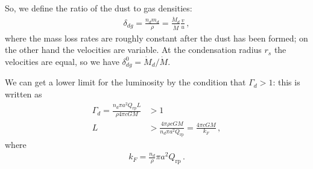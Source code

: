 \documentclass[main.tex]{subfiles}
\begin{document}
So, we define the ratio of the dust to gas densities: 
%
\begin{align}
\delta_{dg} = \frac{n_d m_d}{\rho } = \frac{\dot{M}_{d}}{\dot{M}} \frac{v}{u}
\,,
\end{align}
%
where the mass loss rates are roughly constant after the dust has been formed; on the other hand the velocities are variable. At the condensation radius \(r_s\) the velocities are equal, so we have \(\delta^{0}_{dg} = \dot{M}_{d} / \dot{M}\).

We can get a lower limit for the luminosity by the condition that \(\Gamma_{d}>1\): this is written as 
%
\begin{subequations}
\begin{align}
\Gamma_{d} = \frac{n_d \pi a^2 Q _{\text{rp}} L}{\rho 4 \pi c GM}
&>1  \\
L &> \frac{4 \pi \rho c GM}{n_d \pi a^2 Q _{\text{rp}}} = \frac{4 \pi c GM}{k_F}
\,,
\end{align}
\end{subequations}
%
where 
%
\begin{align}
k_F = \frac{n_d}{\rho } \pi a^2 Q _{\text{rp}}
\,.
\end{align}
\end{document}
